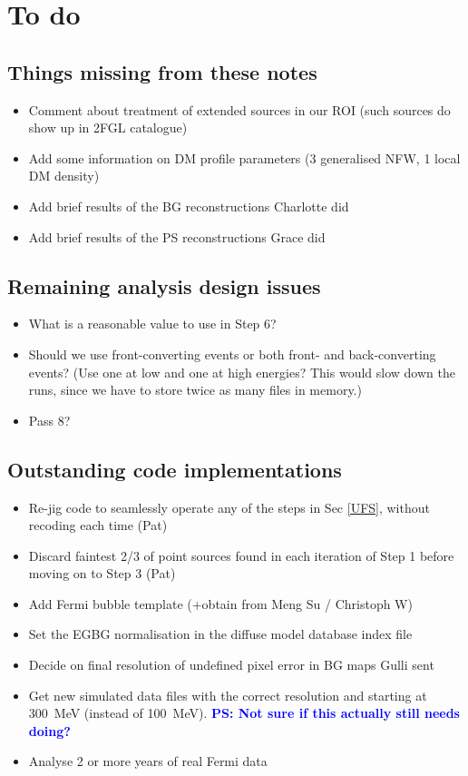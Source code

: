 \documentclass{article}
\newcommand{\ps}[1]{\textcolor{blue}{{\bf PS: #1}}}
\begin{document}
\section{To do}

\subsection{Things missing from these notes}
\begin{itemize}
\item Comment about treatment of extended sources in our ROI (such sources do show up in 2FGL catalogue)
\item Add some information on DM profile parameters (3 generalised NFW, 1 local DM density)
\item Add brief results of the BG reconstructions Charlotte did
\item Add brief results of the PS reconstructions Grace did
\end{itemize}

\subsection{Remaining analysis design issues}
\begin{itemize}
\item What is a reasonable value to use in Step 6?
\item Should we use front-converting events or both front- and back-converting events? (Use one at low and one at high energies?  This would slow down the runs, since we have to store twice as many files in memory.)
\item Pass 8?
\end{itemize}

\subsection{Outstanding code implementations}
\begin{itemize}
\item Re-jig code to seamlessly operate any of the steps in Sec \ref{UFS}, without recoding each time (Pat)
\item Discard faintest 2/3 of point sources found in each iteration of Step 1 before moving on to Step 3 (Pat)
\item Add Fermi bubble template (+obtain from Meng Su / Christoph W)
\item Set the EGBG normalisation in the diffuse model database index file
\item Decide on final resolution of undefined pixel error in BG maps Gulli sent
\item Get new simulated data files with the correct resolution and starting at 300\ MeV (instead of 100\ MeV). \ps{Not sure if this actually still needs doing?}
\item Analyse 2 or more years of real Fermi data
\end{itemize}
\end{document}
